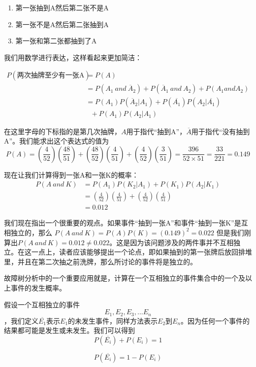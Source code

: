 \documentclass[cn,11pt,chinese]{elegantbook}
\begin{document}
\begin{enumerate}
	\item 第一张抽到A然后第二张不是A
	\item 第一张不是A然后第二张抽到A
	\item 第一张和第二张都抽到了A
\end{enumerate}

我们用数学进行表达，这样看起来更加简洁：

\begin{align*}
	P(\mbox{两次抽牌至少有一张A}) \nonumber &= P(A) \nonumber \\
	&= P(A_1 \ and \ \overline{A}_2)+P(\overline{A}_1 \ and \ A_2)+P(A_1 and A_2) \nonumber \\
	&= P(A_1)P(\overline{A}_2|A_1)+P(\overline{A_1})P(A_2|\overline{A_1}) \nonumber \\ & \ \ \ +P(A_1)P(A_2|A_1)
\end{align*}


在这里字母的下标指的是第几次抽牌，$A$用于指代“抽到A”，$\overline{A}$用于指代“没有抽到A”。我们能求出这个表达式的值为
$$
P(A) = (\frac{4}{52})(\frac{48}{51})+(\frac{48}{52})(\frac{4}{51})+(\frac{4}{52})(\frac{3}{51})=\frac{396}{52\times 51}=\frac{33}{221}=0.149
$$

现在让我们计算得到一张A和一张K的概率：
\begin{align*}
P(A \ and \ K) &=P(A_1)P(K_2|A_1)+P(K_1)P(A_2|K_1) \\
&=(\frac{4}{52})(\frac{4}{51})+(\frac{4}{52})(\frac{4}{51}) \\
&=0.012
\end{align*}

我们现在指出一个很重要的观点。如果事件“抽到一张A”和事件“抽到一张K”是互相独立的，那么
$
P(A \ and\ K)=P(A)P(K)=(0.149)^2 = 0.022$
但是我们刚算出$P(A \ and \ K)=0.012 \neq 0.022$。这是因为该问题涉及的两件事并不互相独立。在这一点上，读者应该能够提出一个论点，即如果抽到的第一张牌后放回排堆里，并且在第二次抽之前洗牌，那么所讨论的事件将是独立的。

故障树分析中的一个重要应用就是，计算在一个互相独立的事件集合中的一个及以上事件的发生概率。

假设一个互相独立的事件$${E_1,E_2,E_3,...E_n}$$，我们定义$\overline{E_1}$表示$E_1$的未发生事件，同样方法表示$E_2$到$E_n$。因为任何一个事件的结果都可能是发生或未发生。我们可以得到
\begin{equation}
P(\overline{E_i})+P(E_i)=1 
\label{eq:eq13}
\end{equation}

\begin{equation}
P(\overline{E_i}) = 1- P(E_i) 
\label{eq:eq14}
\end{equation}
\end{document}

